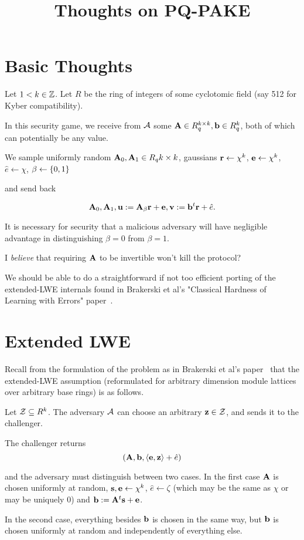 \documentclass[oribibl,envcountsect,envcountsame]{llncs}
\title{Thoughts on PQ-PAKE}
\begin{document}
\section{Basic Thoughts}

Let $ 1 < k \in \mathbb{Z}$. Let $R$ be the ring of integers of some cyclotomic field (say 512 for Kyber compatibility).

In this security game, we receive from $\mathcal{A}$
 some $\mathbf{A} \in R_q^{k \times k}, \mathbf{b} \in R_q^{k}$, both of which can potentially
be any value. 

We sample uniformly random $\mathbf{A}_0, \mathbf{A}_1 \in R_q{k \times k}$, 
gaussians $\mathbf{r} \gets \chi^{k}$, $\mathbf{e} \gets \chi^{k}$, $\hat{e} \gets \chi$,
$\beta \gets \{0,1\}$

and send back 

$$\mathbf{A}_0, \mathbf{A}_1, \mathbf{u} := \mathbf{A}_{\beta}\mathbf{r} + \mathbf{e}, \mathbf{v} := \mathbf{b}^{t}\mathbf{r} + \hat{e}.$$

It is necessary for security that a malicious adversary will have negligible advantage in
distinguishing $\beta=0$ from $\beta=1$.


I \textit{believe} that requiring $\mathbf{A}$ to be invertible won't kill the protocol? 


We should be able to do a straightforward if not too efficient
porting of the extended-LWE internals found in Brakerski et al's "Classical Hardness of Learning with Errors"
paper~\cite{DBLP:conf/stoc/BrakerskiLPRS13}.  

\section{Extended LWE}
\label{sec:ext-lwe}

Recall from the formulation of the problem as in Brakerski et al's paper~\cite{DBLP:conf/stoc/BrakerskiLPRS13} 
that the extended-LWE assumption (reformulated for arbitrary dimension module lattices 
over arbitrary base rings) is as follows. 

\begin{definition}
Let $\mathcal{Z} \subseteq R^{k}$. 
The adversary $\mathcal{A}$ can choose an arbitrary $\mathbf{z} \in \mathcal{Z}$, and sends it to the challenger.

The challenger returns 
$$(\mathbf{A}, \mathbf{b}, \langle\mathbf{e}, \mathbf{z}\rangle+\hat{e})$$

and the adversary must distinguish between two cases. In the first case $\mathbf{A}$ is chosen uniformly 
at random, $\mathbf{s}, \mathbf{e} \gets \chi^{k}$, $\hat{e} \gets \zeta$ (which may be the same as $\chi$ or may be uniquely 0)
 and $\mathbf{b} := \mathbf{A}^{t}\mathbf{s} + \mathbf{e}$. 

In the second case, everything besides $\mathbf{b}$ is chosen in the same way, but $\mathbf{b}$ is chosen uniformly at random 
and independently of everything else.
\end{definition}
\end{document}
